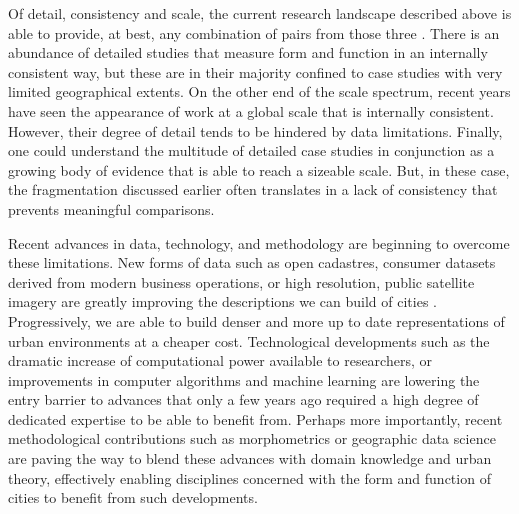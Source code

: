 Of detail, consistency and scale, the current research landscape described above
is able to provide, at best, any combination of pairs from those three \citep{jochem2020,araldi2019,fleischmann2021methodological}.
%
There is an abundance of detailed studies that measure form and
function in an internally consistent way, but these are in their majority confined to
case studies with very limited geographical extents.
%
On the other end of the scale spectrum, recent years have seen the appearance
of work at a global scale that is internally consistent. However, their degree of detail
tends to be hindered by data limitations.
%
Finally, one could understand the multitude of detailed case studies in
conjunction as a growing body of evidence that is able to reach a sizeable
scale. But, in these case, the fragmentation discussed earlier often
translates in a lack of consistency that prevents meaningful comparisons.

Recent advances in data, technology, and methodology are beginning to overcome
these limitations.
New forms of data such as open cadastres, consumer datasets derived from
modern business operations, or high resolution, public satellite imagery are
greatly improving the descriptions we can build of cities
\citep{arribas2014accidental, glaeser2018big, wei2020multiscale, fleischmann2021evolution}. Progressively, we are able to build denser and
more up to date representations of urban environments at a cheaper cost.
Technological developments such as the dramatic increase of computational
power available to researchers, or improvements in computer algorithms and machine
learning are lowering the entry barrier to advances that only a few years ago
required a high degree of dedicated expertise to be able to benefit from.
Perhaps more importantly, recent methodological contributions such as
morphometrics \citep{dibble2016urban} or geographic data science
\citep{singleton2021geographic} are paving the way to blend these advances
with domain knowledge and urban theory, effectively enabling disciplines
concerned with the form and function of cities to benefit from such
developments.


